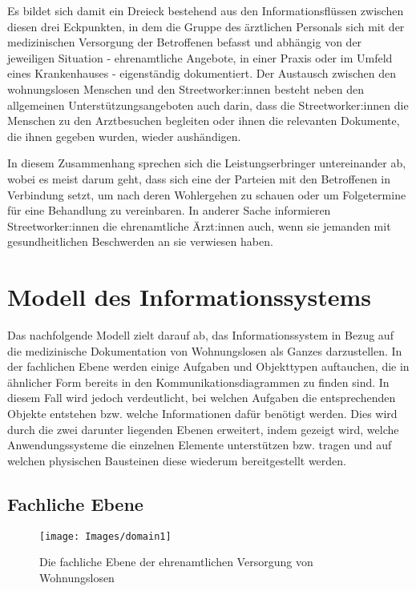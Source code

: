 Es bildet sich damit ein Dreieck bestehend aus den Informationsflüssen zwischen diesen drei Eckpunkten, in dem die Gruppe des ärztlichen Personals sich mit der medizinischen Versorgung der Betroffenen befasst und abhängig von der jeweiligen Situation - ehrenamtliche Angebote, in einer Praxis oder im Umfeld eines Krankenhauses - eigenständig dokumentiert. Der Austausch zwischen den wohnungslosen Menschen und den Streetworker:innen besteht neben den allgemeinen Unterstützungsangeboten auch darin, dass die Streetworker:innen die Menschen zu den Arztbesuchen begleiten oder ihnen die relevanten Dokumente, die ihnen gegeben wurden, wieder aushändigen.

In diesem Zusammenhang sprechen sich die Leistungserbringer untereinander ab, wobei es meist darum geht, dass sich eine der Parteien mit den Betroffenen in Verbindung setzt, um nach deren Wohlergehen zu schauen oder um Folgetermine für eine Behandlung zu vereinbaren. In anderer Sache informieren Streetworker:innen die ehrenamtliche Ärzt:innen auch, wenn sie jemanden mit gesundheitlichen Beschwerden an sie verwiesen haben.


\section{Modell des Informationssystems}\label{sec:3lgm2model}

Das nachfolgende Modell zielt darauf ab, das Informationssystem in Bezug auf die medizinische Dokumentation von Wohnungslosen als Ganzes darzustellen. In der fachlichen Ebene werden einige Aufgaben und Objekttypen auftauchen, die in ähnlicher Form bereits in den Kommunikationsdiagrammen zu finden sind. In diesem Fall wird jedoch verdeutlicht, bei welchen Aufgaben die entsprechenden Objekte entstehen bzw. welche Informationen dafür benötigt werden. Dies wird durch die zwei darunter liegenden Ebenen erweitert, indem gezeigt wird, welche Anwendungssysteme die einzelnen Elemente unterstützen bzw. tragen und auf welchen physischen Bausteinen diese wiederum bereitgestellt werden.

\subsection{Fachliche Ebene}

\begin{figure}[h]
	\centering
	\texttt{[image: Images/domain1]}
	\caption[Fachliche Ebene - ehrenamtliche Versorgung]{Die fachliche Ebene der ehrenamtlichen Versorgung von Wohnungslosen}
	\label{fig:domain1}
\end{figure}

